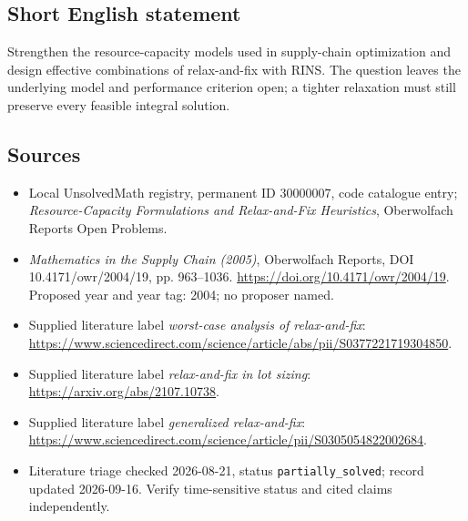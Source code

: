 \documentclass[11pt]{article}
\begin{document}
\subsection{Short English statement}
Strengthen the resource-capacity models used in supply-chain optimization and design effective combinations of relax-and-fix with RINS. The question leaves the underlying model and performance criterion open; a tighter relaxation must still preserve every feasible integral solution.
\subsection{Sources}
\begin{itemize}\item Local UnsolvedMath registry, permanent ID 30000007, code catalogue entry; \emph{Resource-Capacity Formulations and Relax-and-Fix Heuristics}, Oberwolfach Reports Open Problems.\item \emph{Mathematics in the Supply Chain (2005)}, Oberwolfach Reports, DOI 10.4171/owr/2004/19, pp. 963--1036. \url{https://doi.org/10.4171/owr/2004/19}. Proposed year and year tag: 2004; no proposer named.\item Supplied literature label \emph{worst-case analysis of relax-and-fix}: \url{https://www.sciencedirect.com/science/article/abs/pii/S0377221719304850}.\item Supplied literature label \emph{relax-and-fix in lot sizing}: \url{https://arxiv.org/abs/2107.10738}.\item Supplied literature label \emph{generalized relax-and-fix}: \url{https://www.sciencedirect.com/science/article/pii/S0305054822002684}.\item Literature triage checked 2026-08-21, status \texttt{partially\_solved}; record updated 2026-09-16. Verify time-sensitive status and cited claims independently.\end{itemize}
\end{document}
